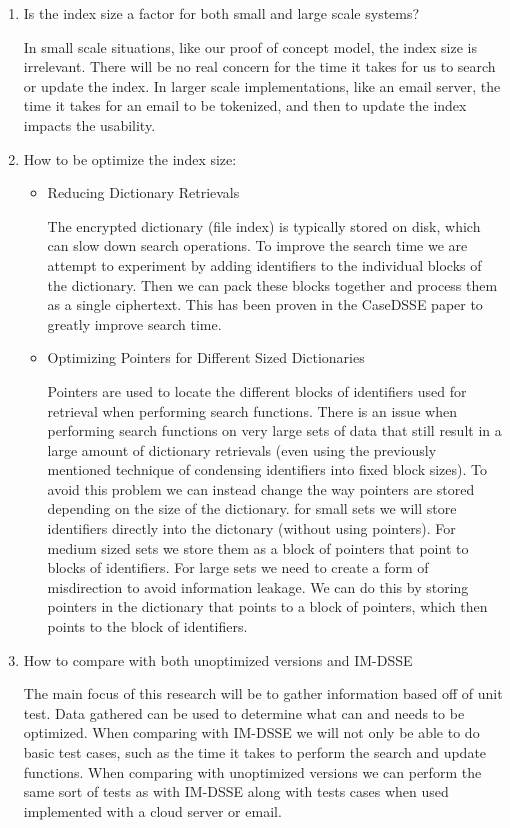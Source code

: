 \begin{enumerate}
	\item Is the index size a factor for both small and large scale systems? 

In small scale situations, like our proof of concept model, the index size is irrelevant.
There will be no real concern for the time it takes for us to search or update the index.
In larger scale implementations, like an email server, the time it takes for an email to be tokenized, and then to update the index impacts the usability.
    
	\item How to be optimize the index size:
    \begin{itemize}
		\item Reducing Dictionary Retrievals
   
The encrypted dictionary (file index) is typically stored on disk, which can slow down search operations. To improve the search time we are attempt to experiment by adding identifiers to the individual blocks of the dictionary. Then we can pack these blocks together and process them as a single ciphertext. This has been proven in the Case\-DSSE paper to greatly improve search time.  

		\item Optimizing Pointers for Different Sized Dictionaries
        
Pointers are used to locate the different blocks of identifiers used for retrieval when performing search functions. There is an issue when performing search functions on very large sets of data that still result in a large amount of dictionary retrievals (even using the previously mentioned technique of condensing identifiers into fixed block sizes). To avoid this problem we can instead change the way pointers are stored depending on the size of the dictionary. for small sets we will store identifiers directly into the dictonary (without using pointers). For medium sized sets we store them as a block of pointers that point to blocks of identifiers. For large sets we need to create a form of misdirection to avoid information leakage. We can do this by storing pointers in the dictionary that points to a block of pointers, which then points to the block of identifiers.  

    \end{itemize}

  	\item How to compare with both unoptimized versions and IM-DSSE

	The main focus of this research will be to gather information based off of unit test.
    Data gathered can be used to determine what can and needs to be optimized.
    When comparing with IM-DSSE we will not only be able to do basic test cases, such as the time it takes to perform the search and update functions.
    When comparing with unoptimized versions we can perform the same sort of tests as with IM-DSSE along with tests cases when used implemented with a cloud server or email. 
\end{enumerate}



